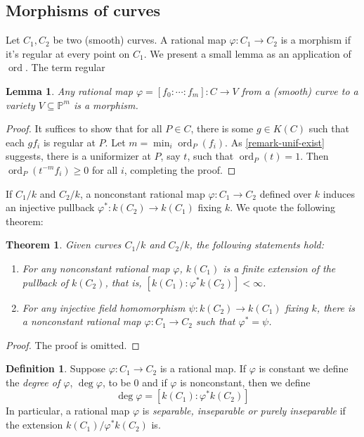 \documentclass[12pt]{article}
\newtheorem{theorem}{Theorem}[subsection]
\newtheorem{lemma}{Lemma}[subsection]
\theoremstyle{remark}
\theoremstyle{definition}
\newtheorem{definition}{Definition}[subsection]
\newcommand{\ord}[0]{\operatorname{ord}}
\begin{document}
        \subsection{Morphisms of curves}
            Let $C_1, C_2$ be two (smooth) curves. A rational map $\varphi: C_1\to C_2$ is a morphism if it's regular at every point on $C_1$. We present a small lemma as an application of $\ord$. The term regular 
            \begin{lemma}
                Any rational map $\varphi=[f_0:\cdots:f_m]:C\to V$ from a (smooth) curve to a variety $V\subseteq \mathbb P^m$ is a morphism.
            \end{lemma}
            \begin{proof}
                It suffices to show that for all $P\in C$, there is some $g\in K(C)$ such that each $gf_i$ is regular at $P$. Let $m=\min_{i}\ord_P(f_i)$. As \autoref{remark-unif-exist} suggests, there is a uniformizer at $P$, say $t$, such that $\ord_P(t)=1$. Then $\ord_P( t^{-m}f_i)\geqslant 0$ for all $i$, completing the proof.
            \end{proof}
            If $C_1/k$ and $C_2/k$, a nonconstant rational map $\varphi:C_1\to C_2$ defined over $k$ induces an injective pullback $\varphi^*:k(C_2)\to k(C_1)$ fixing $k$. We quote the following theorem:
            \begin{theorem}\label{theorem-map-fin}
                Given curves $C_1/k$ and $C_2/k$, the following statements hold:
                \begin{enumerate}[\normalfont(i)]
                    \item For any nonconstant rational map $\varphi$, $k(C_1)$ is a finite extension of the pullback of $k(C_2)$, that is, $[k(C_1):\varphi^*k(C_2)]<\infty$.
                    \item For any injective field homomorphism $\psi:k(C_2)\to k(C_1)$ fixing $k$, there is a nonconstant rational map $\varphi:C_1\to C_2$ such that $\varphi^*=\psi$.
                \end{enumerate}
            \end{theorem}
            \begin{proof}
                The proof is omitted.
            \end{proof}
            \begin{definition}
                Suppose $\varphi:C_1\to C_2$ is a rational map. If $\varphi$ is constant we define the \textit{degree of $\varphi$}, $\deg\varphi$, to be $0$ and if $\varphi$ is nonconstant, then we define
                \[\deg\varphi=[k(C_1):\varphi^*k(C_2)]\]
                In particular, a rational map $\varphi$ is \textit{separable, inseparable or purely inseparable} if the extension $k(C_1)/\varphi^*k(C_2)$ is.
            \end{definition}
\end{document}
